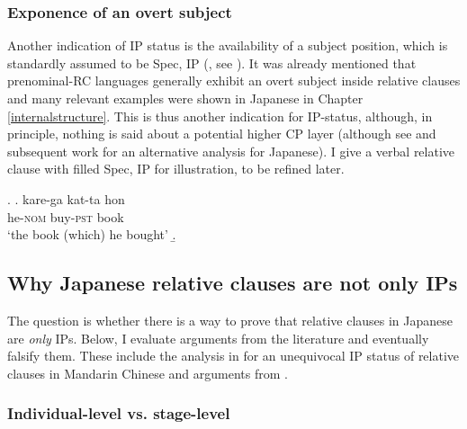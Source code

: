 \documentclass [output=book,colorlinks,citecolor=brown]{langscibook}
\begin{document}
\subsubsection{Exponence of an overt subject}

Another indication of IP status is the availability of a subject position, which is standardly assumed to be Spec, IP (\citealt{chomsky:1986:barriers, koopman:1991:the}, see \citealt{mccloskey:1997:subject}). It was already mentioned that prenominal-RC languages generally exhibit an overt subject inside relative clauses and many relevant examples were shown in Japanese in Chapter \ref{internalstructure}. This is thus another indication for IP-status, although, in principle, nothing is said about a potential higher CP layer (although see \citealt{fukui:1986:theory} and subsequent work for an alternative analysis for Japanese). I give a verbal relative clause with filled Spec, IP for illustration, to be refined later. %


\ex. \ag. kare-ga kat-ta hon\\
he-\textsc{nom} buy-\textsc{pst} book\\
`the book (which) he bought'
 \b. 

\subsection{Why Japanese relative clauses are not only IPs}

The question is whether there is a way to prove that relative clauses in Japanese are \textit{only} IPs. Below, I evaluate arguments from the literature and eventually falsify them. These include the analysis in \citet{cinque:2020:relcl} for an unequivocal IP status of relative clauses in Mandarin Chinese and arguments from \citet{murasugi:1991:noun}.

\subsubsection{Individual-level vs. stage-level}
\end{document}
